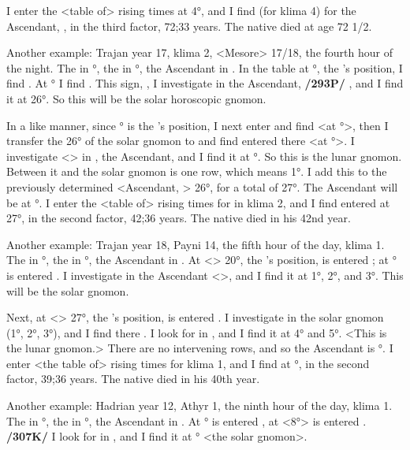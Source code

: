 I enter the <table of> rising times at 4°, and I find (for klima 4) for the Ascendant, \Scorpio, in the third factor, 72;33 years.
The native died at age 72 1/2.

Another example: Trajan year 17, klima 2, <Mesore> 17/18, the fourth hour of the night. The \Sun\xspace in °, the \Moon\xspace in \Taurus\xspace 14°, the Ascendant in \Aries. In the table at \Leo\xspace 22°, the \Sun’s position, I find \Virgo. At \Virgo\xspace 22° I find \Cancer. This sign, \Cancer, I investigate in the Ascendant, \textbf{/293P/} \Aries, and I find it at 26°. So this will be the solar horoscopic gnomon. 

In a like manner, since \Taurus\xspace 14° is the \Moon’s position, I next enter \Taurus\xspace and find \Gemini\xspace <at \Taurus\xspace 14°>, then I transfer the 26° of the solar gnomon to \Gemini\xspace and find \Aquarius\xspace entered there <at \Gemini\xspace 26°>. I investigate <\Aquarius> in \Aries, the Ascendant, and I find it at °. So this is the lunar gnomon. Between it and the solar gnomon is one row, which means 1°. I add this to the previously determined <Ascendant, \Aries> 26°, for
a total of 27°. The Ascendant will be at \Aries\xspace 27°. I enter the <table of> rising times for \Aries\xspace in klima 2, and I find entered at 27°, in the second factor, 42;36 years. The native died in his 42nd year.

Another example: Trajan year 18, Payni 14, the fifth hour of the day, klima 1. The \Sun\xspace in \Gemini\xspace 20°, the \Moon\xspace in \Taurus\xspace 27°, the Ascendant in \Virgo. At <\Gemini> 20°, the \Sun’s position, is entered \Cancer; at \Cancer\xspace 20° is entered \Virgo. I investigate \Virgo\xspace in the Ascendant <\Virgo>, and I find it at 1°, 2°, and 3°. This will be the solar gnomon. 

Next, at <\Taurus> 27°, the \Moon’s position, is entered
\Aries. I investigate in \Aries the solar gnomon (1°, 2°, 3°), and I find there \Leo. I look for \Leo\xspace in \Virgo, and I find it at 4° and 5°. <This is the lunar gnomon.> There are no intervening rows, and so the Ascendant is \Virgo\xspace 1°. I enter <the table of> rising times for klima 1, and I find at \Virgo\xspace 1°, in the second
factor, 39;36 years. The native died in his 40th year.

Another example: Hadrian year 12, Athyr 1, the ninth hour of the day, klima 1. The \Sun\xspace in \Scorpio\xspace 8°, the \Moon\xspace in \Capricorn\xspace 17°, the Ascendant in \Pisces. At \Scorpio\xspace 8° is entered \Taurus, at \Taurus <8°> is entered \Libra. \textbf{/307K/} I look for \Libra\xspace in \Pisces, and I find it at \Pisces\xspace 9° <the solar gnomon>. 

